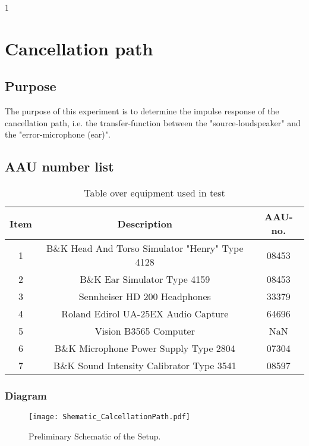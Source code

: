 1\section{Cancellation path}
\subsection{Purpose}
The purpose of this experiment is to determine the impulse response of the cancellation path, i.e. the transfer-function between the "source-loudspeaker" and the "error-microphone (ear)".
		
\subsection{AAU number list}
\begin{table}[h]
	\centering
	\begin{tabular}{ c c c } \toprule
		{Item}	& {Description} 						& {AAU-no}. \\ \bottomrule 
		1	&	B\&K Head And Torso Simulator "Henry" Type 4128	& 08453		\\
		2	&	B\&K Ear Simulator Type 4159			& 08453		\\
		3	&	Sennheiser HD 200	Headphones			& 33379		\\
		4	&	Roland Edirol UA-25EX Audio Capture		& 64696		\\
		5	&	Vision B3565 Computer					& NaN		\\
		6	&	B\&K Microphone Power Supply Type 2804	& 07304		\\
		7	&	B\&K Sound Intensity Calibrator Type 3541	& 08597	\\ \bottomrule
	\end{tabular}
	\caption{Table over equipment used in test}
	\label{tab:UsedEquipmentListningCP}
\end{table}

\subsubsection{Diagram}
\begin{figure}[H]
	\centering
	\texttt{[image: Shematic\_CalcellationPath.pdf]}
	\caption{Preliminary Schematic of the Setup.}
	\label{Schematic}
\end{figure}

